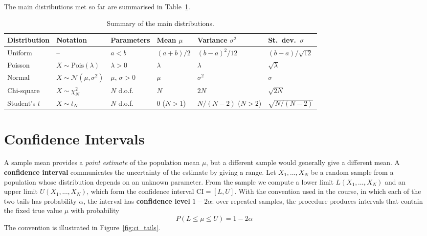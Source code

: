 \documentclass[letterpaper,11pt,leqno]{book}
\begin{document}
The main distributions met so far are summarised in Table~\ref{tab:distributions_summary}.

\begin{table}[!htbp]
\centering
\caption{Summary of the main distributions.}
\label{tab:distributions_summary}
\begin{tabular*}{\textwidth}{l@{\extracolsep\fill}lllll}
\toprule
Distribution & Notation & Parameters & Mean $\mu$ & Variance $\sigma^2$ & St.\ dev.\ $\sigma$ \\
\midrule
Uniform & -- & $a < b$ & $(a + b)/2$ & $(b - a)^2/12$ & $(b - a)/\sqrt{12}$ \\
Poisson & $X \sim \text{Pois}(\lambda)$ & $\lambda > 0$ & $\lambda$ & $\lambda$ & $\sqrt{\lambda}$ \\
Normal & $X \sim \mathcal{N}(\mu, \sigma^2)$ & $\mu$, $\sigma > 0$ & $\mu$ & $\sigma^2$ & $\sigma$ \\
Chi-square & $X \sim \chi_N^2$ & $N$ d.o.f. & $N$ & $2N$ & $\sqrt{2N}$ \\
Student's $t$ & $X \sim t_N$ & $N$ d.o.f. & $0$ ($N > 1$) & $N/(N - 2)$ ($N > 2$) & $\sqrt{N/(N - 2)}$ \\
\bottomrule
\end{tabular*}
\end{table}

\section{Confidence Intervals}
\label{sec:confidence_intervals}

A sample mean provides a \emph{point estimate} of the population mean $\mu$, but a different sample would generally give a different mean. A \textbf{confidence interval} communicates the uncertainty of the estimate by giving a range. Let $X_1, \dots, X_N$ be a random sample from a population whose distribution depends on an unknown parameter. From the sample we compute a lower limit $L(X_1, \dots, X_N)$ and an upper limit $U(X_1, \dots, X_N)$, which form the confidence interval $\text{CI} = [L, U]$. With the convention used in the course, in which each of the two tails has probability $\alpha$, the interval has \textbf{confidence level} $1 - 2\alpha$: over repeated samples, the procedure produces intervals that contain the fixed true value $\mu$ with probability
\begin{equation}
\boxed{P(L \le \mu \le U) = 1 - 2\alpha}
\label{eq:ci_definition}
\end{equation}
The convention is illustrated in Figure~\ref{fig:ci_tails}.
\end{document}
